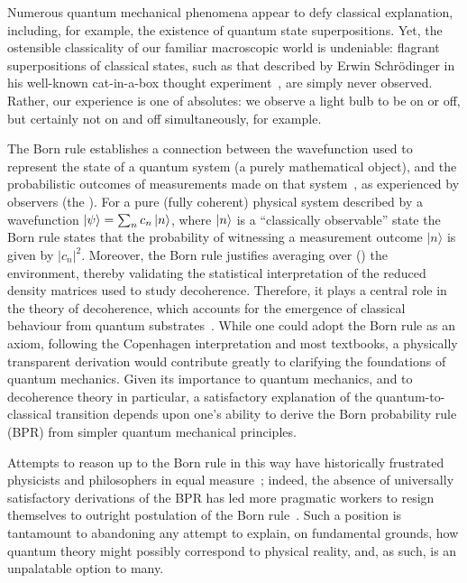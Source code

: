 \documentclass[12pt]{iopart}
\begin{document}
Numerous quantum mechanical phenomena appear to defy classical explanation, including, for example, the existence of quantum state superpositions. Yet, the ostensible classicality of our familiar macroscopic world is undeniable: flagrant superpositions of classical states, such as that described by Erwin Schr\"odinger in his well-known cat-in-a-box thought experiment~\cite{schrodinger:35}, are simply never observed. Rather, our experience is one of absolutes: we observe a light bulb to be on or off, but certainly not on and off simultaneously, for example. 

The Born rule establishes a connection between the wavefunction used to represent the state of a quantum system (a purely mathematical object), and the probabilistic outcomes of measurements made on that system~\cite{born:26}, as experienced by observers (the ). {For a pure (fully coherent) physical system described by a wavefunction $\left| \psi \right\rangle = \sum_n c_n \left| n \right\rangle$, where $\left| n \right\rangle$ is a ``classically observable'' state the Born rule states that the probability} of witnessing a measurement outcome $|n\rangle$ is given by $|c_n|^2$. Moreover, the Born rule justifies averaging over () the environment, thereby validating the statistical interpretation of the reduced density matrices used to study decoherence. Therefore, it plays a central role in the theory of decoherence, which accounts for the emergence of classical behaviour from quantum substrates~\cite{schlosshauer:07}.  While one could adopt the Born rule as an axiom, following the Copenhagen interpretation and most textbooks, a physically transparent derivation would contribute greatly to clarifying the foundations of quantum mechanics. Given its importance to quantum mechanics, and to decoherence theory in particular, a satisfactory explanation of the quantum-to-classical transition depends upon one's ability to derive the Born probability rule (BPR) from simpler quantum mechanical principles. 
%

Attempts to reason up to the Born rule in this way have historically frustrated physicists and philosophers in equal measure~\cite{footnote:00}; indeed, the absence of universally satisfactory derivations of the BPR has led more pragmatic workers to resign themselves to outright postulation of the Born rule~\cite{footnote:01}. Such a position is tantamount to abandoning any attempt to explain, on fundamental grounds, how quantum theory might possibly correspond to physical reality, and, as such, is an unpalatable option to many. 
\end{document}
